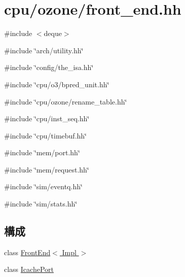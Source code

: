 \hypertarget{front__end_8hh}{
\section{cpu/ozone/front\_\-end.hh}
\label{front__end_8hh}
}
{\ttfamily \#include $<$deque$>$}\par
{\ttfamily \#include \char`\"{}arch/utility.hh\char`\"{}}\par
{\ttfamily \#include \char`\"{}config/the\_\-isa.hh\char`\"{}}\par
{\ttfamily \#include \char`\"{}cpu/o3/bpred\_\-unit.hh\char`\"{}}\par
{\ttfamily \#include \char`\"{}cpu/ozone/rename\_\-table.hh\char`\"{}}\par
{\ttfamily \#include \char`\"{}cpu/inst\_\-seq.hh\char`\"{}}\par
{\ttfamily \#include \char`\"{}cpu/timebuf.hh\char`\"{}}\par
{\ttfamily \#include \char`\"{}mem/port.hh\char`\"{}}\par
{\ttfamily \#include \char`\"{}mem/request.hh\char`\"{}}\par
{\ttfamily \#include \char`\"{}sim/eventq.hh\char`\"{}}\par
{\ttfamily \#include \char`\"{}sim/stats.hh\char`\"{}}\par
\subsection*{構成}
\begin{DoxyCompactItemize}
\item 
class \hyperlink{classFrontEnd}{FrontEnd$<$ Impl $>$}
\item 
class \hyperlink{classFrontEnd_1_1IcachePort}{IcachePort}
\end{DoxyCompactItemize}
